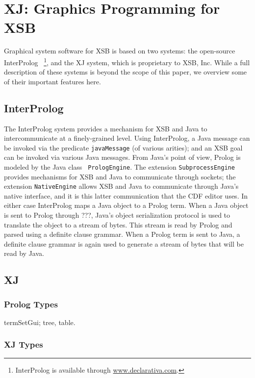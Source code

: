 \chapter{XJ: Graphics Programming for XSB}

Graphical system software for XSB is based on two systems: the
open-source InterProlog \cite{Cale01}~\footnote{InterProlog is
available through \url{www.declarativa.com}.}, and the XJ system,
which is proprietary to XSB, Inc.  While a full description of these
systems is beyond the scope of this paper, we overview some of their
important features here.

\section{InterProlog}

The InterProlog system provides a mechanism for XSB and Java to
intercommunicate at a finely-grained level.  Using InterProlog, a Java
message can be invoked via the predicate {\tt javaMessage} (of various
arities); and an XSB goal can be invoked via various Java messages.
From Java's point of view, Prolog is modeled by the Java class {\tt
PrologEngine}.  The extension {\tt SubprocessEngine} provides
mechanisms for XSB and Java to communicate through sockets; the
extension {\tt NativeEngine} allows XSB and Java to communicate
through Java's native interface, and it is this latter communication
that the CDF editor uses.  In either case InterProlog maps a Java
object to a Prolog term.  When a Java object is sent to Prolog {\sc
through ???}, Java's object serialization protocol is used to
translate the object to a stream of bytes.  This stream is read by
Prolog and parsed using a definite clause grammar.  When a Prolog term
is sent to Java, a definite clause grammar is again used to generate a
stream of bytes that will be read by Java.

\section{XJ}

\subsection{Prolog Types}

termSetGui; tree, table.

\subsection{XJ Types}

